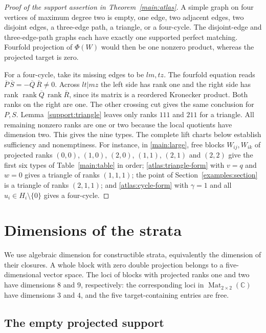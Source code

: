 \documentclass[11pt,letterpaper]{article}
\newcommand{\C}{\mathbb C}
\newcommand{\rk}{\operatorname{rank}}
\theoremstyle{definition}
\begin{document}
\begin{proof}[Proof of the support assertion in Theorem~\ref{main:atlas}]
A simple graph on four vertices of maximum degree two is empty, one edge,
two adjacent edges, two disjoint edges, a three-edge path, a triangle,
or a four-cycle. The disjoint-edge and three-edge-path graphs each have
exactly one supported perfect matching. Fourfold projection of \(\Phi(W)\)
would then be one nonzero product, whereas the projected target is zero.

For a four-cycle, take its missing edges to be \(lm,tz\).
The fourfold equation reads
\(\overline P\,\overline S=-\overline Q\,\overline R\ne0\).
Across \(lt|mz\) the left side has rank one and the right side has rank
\(\rk\overline Q\,\rk\overline R\), since its matrix is a reordered
Kronecker product. Both ranks on the right are one. The other crossing
cut gives the same conclusion for \(P,S\).
Lemma~\ref{support:triangle} leaves only ranks \(111\) and \(211\) for
a triangle. All remaining nonzero ranks are one or two because the local
quotients have dimension two. This gives the nine types.
The complete lift charts below establish sufficiency and nonemptiness.
For instance, in \eqref{main:large}, free blocks \(W_{ij},W_{ik}\) of
projected ranks \((0,0)\), \((1,0)\), \((2,0)\), \((1,1)\), \((2,1)\) and
\((2,2)\) give the first six types of Table~\ref{main:table} in order;
\eqref{atlas:triangle-form} with \(v=q\) and \(w=0\) gives a triangle of
ranks \((1,1,1)\); the point of Section~\ref{examples:section} is a
triangle of ranks \((2,1,1)\); and \eqref{atlas:cycle-form} with
\(\gamma=1\) and all \(u_i\in H_i\setminus\{0\}\) gives a four-cycle.
\end{proof}



\section{Dimensions of the strata}\label{geom:section}

We use algebraic dimension for constructible strata, equivalently the
dimension of their closures. A whole block with zero double projection
belongs to a five-dimensional vector space. The loci of blocks with
projected ranks one and two have dimensions \(8\) and \(9\), respectively:
the corresponding loci in \(\operatorname{Mat}_{2\times2}(\C)\) have
dimensions \(3\) and \(4\), and the five target-containing entries are free.

\subsection{The empty projected support}
\end{document}

